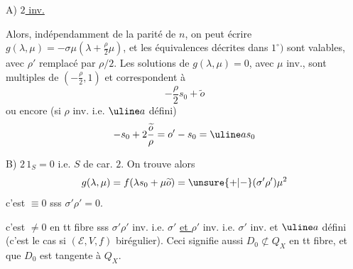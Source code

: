 A) \uline{$2$ inv.}

Alors, indépendamment de la parité de $n$, on peut écrire
$g(\lambda,\mu)=-\sigma\mu(\lambda+\frac{\rho}{2}\mu)$,
et les équivalences décrites dans $1^\circ)$ sont valables,
avec $\rho'$ remplacé par $\rho/2$.
Les solutions de $g(\lambda,\mu)=0$, avec $\mu$ inv.,
sont multiples de $(-\frac{\rho}{2},1)$ et correspondent à
\[
-\frac{\rho}{2}s_0+\widetilde o
\]
ou encore 
(si $\rho$ inv. i.e. $\uline a$ défini)
\[
-s_0+2\frac{\widetilde o}{\rho}=o'-s_0=\uline a s_0
\]

B) $2\,1_S=0$ i.e. $S$ de car. $2$.
On trouve alors 
\[
g(\lambda,\mu)=f(\lambda s_0+\mu\widetilde o)
=\unsure{+|-}(\sigma'\rho')\mu^2
\]
c'est $\equiv0$ sss $\sigma'\rho'=0$.

c'est $\neq0$ en tt fibre sss $\sigma'\rho'$ inv.
i.e. $\sigma'$ \uline{et $\rho'$} inv.
i.e. $\sigma'$ inv. et $\uline a$ défini
(c'est le cas si $(\mathcal E,V,f)$ birégulier).
 Ceci signifie aussi
$D_0\not\subset Q_X$ en tt fibre, et  que
$D_0$ est tangente à $Q_X$.


